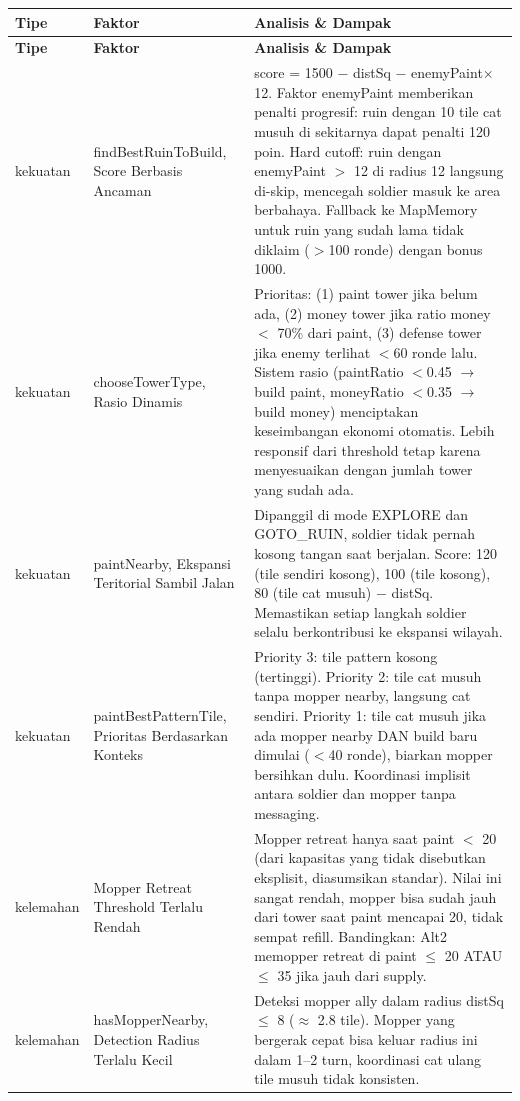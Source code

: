 \documentclass{article}
\begin{document}
\begin{enumerate}[label=\alph*.]
\begin{longtable}{|p{2cm}|p{3.5cm}|p{8.5cm}|}
\hline
\textbf{Tipe} & \textbf{Faktor} & \textbf{Analisis \& Dampak} \\
\hline
\endfirsthead
\hline
\textbf{Tipe} & \textbf{Faktor} & \textbf{Analisis \& Dampak} \\
\hline
\endhead
\hline
\endfoot
kekuatan
& findBestRuinToBuild, Score Berbasis Ancaman
& score = 1500 $-$ distSq $-$ enemyPaint$\times$12. Faktor enemyPaint memberikan penalti progresif: ruin dengan 10 tile cat musuh di sekitarnya dapat penalti 120 poin.
Hard cutoff: ruin dengan enemyPaint $>$ 12 di radius 12 langsung di-skip, mencegah soldier masuk ke area berbahaya.
Fallback ke MapMemory untuk ruin yang sudah lama tidak diklaim ($>$100 ronde) dengan bonus 1000. \\
\hline
kekuatan
& chooseTowerType, Rasio Dinamis
& Prioritas: (1) paint tower jika belum ada, (2) money tower jika ratio money $<$ 70\% dari paint, (3) defense tower jika enemy terlihat $<$60 ronde lalu.
Sistem rasio (paintRatio $<$0.45 $\rightarrow$ build paint, moneyRatio $<$0.35 $\rightarrow$ build money) menciptakan keseimbangan ekonomi otomatis.
Lebih responsif dari threshold tetap karena menyesuaikan dengan jumlah tower yang sudah ada. \\
\hline
kekuatan
& paintNearby, Ekspansi Teritorial Sambil Jalan
& Dipanggil di mode EXPLORE dan GOTO\_RUIN, soldier tidak pernah kosong tangan saat berjalan.
Score: 120 (tile sendiri kosong), 100 (tile kosong), 80 (tile cat musuh) $-$ distSq.
Memastikan setiap langkah soldier selalu berkontribusi ke ekspansi wilayah. \\
\hline
kekuatan
& paintBestPatternTile, Prioritas Berdasarkan Konteks
& Priority 3: tile pattern kosong (tertinggi).
Priority 2: tile cat musuh tanpa mopper nearby, langsung cat sendiri.
Priority 1: tile cat musuh jika ada mopper nearby DAN build baru dimulai ($<$40 ronde), biarkan mopper bersihkan dulu.
Koordinasi implisit antara soldier dan mopper tanpa messaging. \\
\hline
kelemahan
& Mopper Retreat Threshold Terlalu Rendah
& Mopper retreat hanya saat paint $<$ 20 (dari kapasitas yang tidak disebutkan eksplisit, diasumsikan standar).
Nilai ini sangat rendah, mopper bisa sudah jauh dari tower saat paint mencapai 20, tidak sempat refill.
Bandingkan: Alt2 memopper retreat di paint $\leq$ 20 ATAU $\leq$ 35 jika jauh dari supply. \\
\hline
kelemahan
& hasMopperNearby, Detection Radius Terlalu Kecil
& Deteksi mopper ally dalam radius distSq $\leq$ 8 ($\approx$ 2.8 tile).
Mopper yang bergerak cepat bisa keluar radius ini dalam 1--2 turn, koordinasi cat ulang tile musuh tidak konsisten. \\
\hline
\end{longtable}


\end{enumerate}
\end{document}
